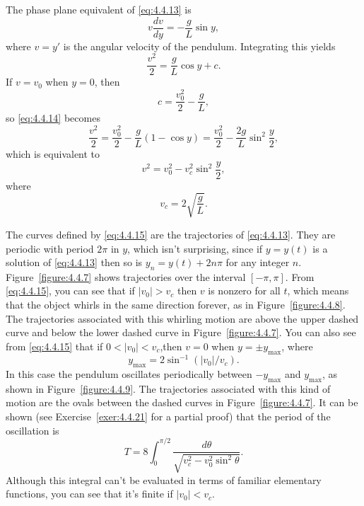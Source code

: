\begin{example}
  The phase plane equivalent of \eqref{eq:4.4.13} is
  \[
    v\frac{dv}{dy}=-\frac{g}{L}\sin y,
  \]
  where $v=y'$ is the angular velocity of the pendulum. Integrating this yields
  \begin{equation}
    \label{eq:4.4.14}\frac{v^{2}}{2}=\frac{g}{L}\cos y+c.
  \end{equation}
  If $v=v_{0}$ when $y=0$, then
  \[
    c=\frac{v_{0}^{2}}{2}-\frac{g}{L},
  \]
  so \eqref{eq:4.4.14} becomes
  \[
    \frac{v^{2}}{2}=\frac{v_{0}^{2}}{2}-\frac{g}{L}(1-\cos y) =\frac{v_{0}^{2}}{2}-\frac{2g}{L}\sin^{2}\frac{y}{2},
  \]
  which is equivalent to
  \begin{equation}
    \label{eq:4.4.15}v^{2}=v_{0}^{2}-v_{c}^{2}\sin^{2}\frac{y}{2},
  \end{equation}
  where
  \[
    v_{c}=2\sqrt{\frac{g}{L}}.
  \]

  The curves defined by \eqref{eq:4.4.15} are the trajectories of \eqref{eq:4.4.13}. They are
  periodic with period $2\pi$ in $y$, which isn't surprising, since if $y=y(t)$ is a solution of
  \eqref{eq:4.4.13} then so is $y_{n}=y(t)+2n\pi$ for any integer $n$. Figure~\ref{figure:4.4.7}
  shows trajectories over the interval $[-\pi,\pi]$. From \eqref{eq:4.4.15}, you can see that if
  $|v_{0}|>v_{c}$ then $v$ is nonzero for all $t$, which means that the object whirls in the same
  direction forever, as in Figure~\ref{figure:4.4.8}. The trajectories associated with this whirling
  motion are above the upper dashed curve and below the lower dashed curve in
  Figure~\ref{figure:4.4.7}. You can also see from \eqref{eq:4.4.15} that if $0<|v_{0}|<v_{c}$,then
  $v=0$ when $y=\pm y_{\max}$, where
  \[
    y_{\max}=2\sin^{-1}(|v_{0}|/v_{c}).
  \]
  In this case the pendulum oscillates periodically between $-y_{\max}$ and $y_{\max}$, as shown in
  Figure~\ref{figure:4.4.9}. The trajectories associated with this kind of motion are the ovals
  between the dashed curves in Figure~\ref{figure:4.4.7}. It can be shown (see
  Exercise~\ref{exer:4.4.21} for a partial proof) that the period of the oscillation is
  \begin{equation}
    \label{eq:4.4.16}T=8\int_{0}^{\pi/2}\frac{d\theta}{\sqrt{v_{c}^{2}-v_{0}^{2}\sin^{2}\theta}}.
  \end{equation}
  Although this integral can't be evaluated in terms of familiar elementary functions, you can see
  that it's finite if $|v_{0}|<v_{c}$.


\end{example}
